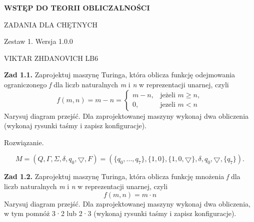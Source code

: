 \documentclass[12pt]{article}
\begin{document}
\begin{titlepage}
	\begin{center}
		{\LARGE\bfseries WSTĘP DO TEORII 			OBLICZALNOŚCI\par}
		\vspace{3cm}
		ZADANIA DLA CHĘTNYCH \par
		Zestaw 1. Wersja 1.0.0 \par
	\end{center}
	\vfill\centering VIKTAR ZHDANOVICH LB6 \par
\end{titlepage}

\newpage

\noindent\textbf{Zad 1.1.} Zaprojektuj  maszynę  Turinga,  która  oblicza  funkcję  odejmowania ograniczonego \textit{f} dla liczb naturalnych \textit{m} i \textit{n} w reprezentacji unarnej, czyli
\[ f(m,n) = m - n = 
  \begin{cases}
   	m - n, & \text{jeżeli } m \geq n, \\
   	0, & \text{jezeli } m < n
  \end{cases}
\]
Narysuj diagram przejść. Dla zaprojektowanej maszyny wykonaj dwa obliczenia (wykonaj rysunki taśmy i zapisz konfiguracje).

 Rozwiązanie.
 
\[M=(Q,\Gamma,\Sigma,\delta,q_0,\bigtriangledown,F)=(\{q_0,...,q_7\},\{1,0\},\{1,0,\bigtriangledown\},\delta,q_0,\bigtriangledown,\{q_7\}).\]

\vspace{20pt}

\begin{center}
\end{center}

\newpage
\noindent\textbf{Zad 1.2.} Zaprojektuj maszynę Turinga, która oblicza funkcję mnożenia \textit{f} dla liczb naturalnych \textit{m} i \textit{n} w reprezentacji unarnej, czyli
\[f(m,n)=m \cdot n\]
Narysuj diagram przejść. Dla zaprojektowanej maszyny wykonaj dwa obliczenia, w tym pomnóż 3·2 lub 2·3 (wykonaj rysunki taśmy i zapisz konfiguracje).
\end{document}
